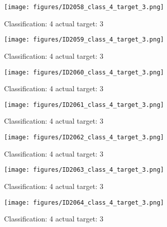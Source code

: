 \begin{figure}[h!]
\begin{center}
\texttt{[image: figures/ID2058\_class\_4\_target\_3.png]}
\end{center}
\caption{ Classification: 4 actual target: 3}
\label{fig:ID2058_class_4_target_3}
\end{figure}
\begin{figure}[h!]
\begin{center}
\texttt{[image: figures/ID2059\_class\_4\_target\_3.png]}
\end{center}
\caption{ Classification: 4 actual target: 3}
\label{fig:ID2059_class_4_target_3}
\end{figure}
\begin{figure}[h!]
\begin{center}
\texttt{[image: figures/ID2060\_class\_4\_target\_3.png]}
\end{center}
\caption{ Classification: 4 actual target: 3}
\label{fig:ID2060_class_4_target_3}
\end{figure}
\begin{figure}[h!]
\begin{center}
\texttt{[image: figures/ID2061\_class\_4\_target\_3.png]}
\end{center}
\caption{ Classification: 4 actual target: 3}
\label{fig:ID2061_class_4_target_3}
\end{figure}
\begin{figure}[h!]
\begin{center}
\texttt{[image: figures/ID2062\_class\_4\_target\_3.png]}
\end{center}
\caption{ Classification: 4 actual target: 3}
\label{fig:ID2062_class_4_target_3}
\end{figure}
\begin{figure}[h!]
\begin{center}
\texttt{[image: figures/ID2063\_class\_4\_target\_3.png]}
\end{center}
\caption{ Classification: 4 actual target: 3}
\label{fig:ID2063_class_4_target_3}
\end{figure}
\begin{figure}[h!]
\begin{center}
\texttt{[image: figures/ID2064\_class\_4\_target\_3.png]}
\end{center}
\caption{ Classification: 4 actual target: 3}
\label{fig:ID2064_class_4_target_3}
\end{figure}
